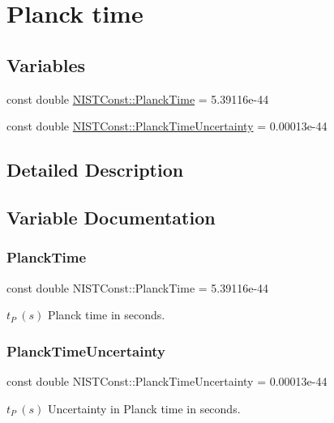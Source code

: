 \hypertarget{group___n_i_s_t_const-_planck_time}{}\section{Planck time}
\label{group___n_i_s_t_const-_planck_time}
\subsection*{Variables}
\begin{DoxyCompactItemize}
\item 
const double \hyperlink{group___n_i_s_t_const-_planck_time_gac9e14a0a1b63ee5342e81d860131b036}{N\+I\+S\+T\+Const\+::\+Planck\+Time} = 5.\+39116e-\/44
\item 
const double \hyperlink{group___n_i_s_t_const-_planck_time_ga05e9961b507af78ada2a1efbc350fc08}{N\+I\+S\+T\+Const\+::\+Planck\+Time\+Uncertainty} = 0.\+00013e-\/44
\end{DoxyCompactItemize}


\subsection{Detailed Description}


\subsection{Variable Documentation}
\mbox{\label{group___n_i_s_t_const-_planck_time_gac9e14a0a1b63ee5342e81d860131b036}} 
\subsubsection{\texorpdfstring{Planck\+Time}{PlanckTime}}
{\footnotesize\ttfamily const double N\+I\+S\+T\+Const\+::\+Planck\+Time = 5.\+39116e-\/44}

$t_P \ (s)$ Planck time in seconds. \mbox{\label{group___n_i_s_t_const-_planck_time_ga05e9961b507af78ada2a1efbc350fc08}} 
\subsubsection{\texorpdfstring{Planck\+Time\+Uncertainty}{PlanckTimeUncertainty}}
{\footnotesize\ttfamily const double N\+I\+S\+T\+Const\+::\+Planck\+Time\+Uncertainty = 0.\+00013e-\/44}

$t_P \ (s)$ Uncertainty in Planck time in seconds. 